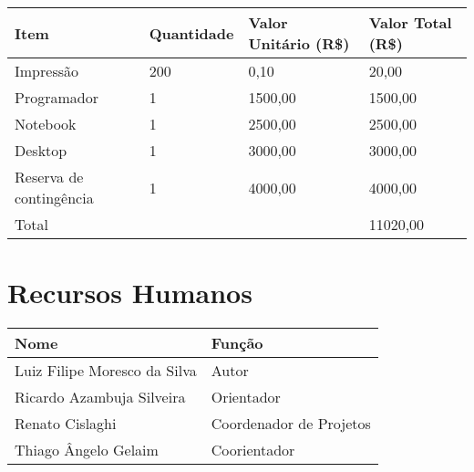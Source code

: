     \begin{tabular}{l l l l}
        \hline

        Item                    &   Quantidade  &   Valor Unitário (R\$)    &   Valor Total (R\$) \\
        \hline
        Impressão               &   200         &   0,10                    &   20,00             \\

        Programador             &   1           &   1500,00                 &   1500,00           \\
        Notebook                &   1           &   2500,00                 &   2500,00           \\
        Desktop                 &   1           &   3000,00                 &   3000,00           \\
        Reserva de contingência &   1           &   4000,00                 &   4000,00           \\

        \hline
        Total                   &               &                           &   11020,00

    \end{tabular}
    \hfill\cite{Silva}


\section{Recursos Humanos}
    \begin{tabular}{l l}
        \hline
        Nome                            & Função                  \\
        \hline
        Luiz Filipe Moresco da Silva    & Autor                   \\
        Ricardo Azambuja Silveira       & Orientador              \\
        Renato Cislaghi                 & Coordenador de Projetos \\
        Thiago Ângelo Gelaim            & Coorientador            \\
        \hline
    \end{tabular}
    \\



